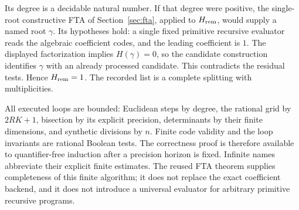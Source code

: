 Its degree is a decidable natural number. If that degree were positive,
the single-root constructive FTA of Section~\ref{sec:fta}, applied to
$H_{\rm rem}$, would supply a named root $\gamma$.
Its hypotheses hold: a single fixed primitive recursive evaluator reads
the algebraic coefficient codes, and the leading coefficient is $1$.
The displayed factorization implies $H(\gamma)=0$, so the candidate
construction identifies $\gamma$ with an already processed candidate.
This contradicts the residual tests. Hence $H_{\rm rem}=1$.
The recorded list is a complete splitting with multiplicities.

All executed loops are bounded: Euclidean steps by degree, the rational
grid by $2RK+1$, bisection by its explicit precision, determinants by their
finite dimensions, and synthetic divisions by $n$.
Finite code validity and the loop invariants are rational Boolean tests.
The correctness proof is therefore available to quantifier-free induction
after a precision horizon is fixed. Infinite names abbreviate their
explicit finite estimates. The reused FTA theorem supplies completeness
of this finite algorithm; it does not replace the exact coefficient
backend, and it does not introduce a universal evaluator for arbitrary
primitive recursive programs.
